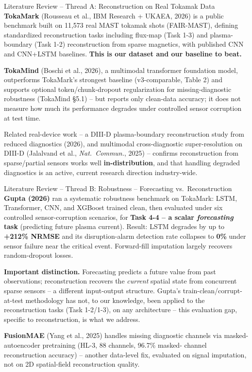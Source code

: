 \documentclass[aspectratio=169]{beamer}
\begin{document}
\begin{frame}{Literature Review -- Thread A: Reconstruction on Real Tokamak Data}
  \small
  \textbf{TokaMark} (Rousseau et al., IBM Research + UKAEA, 2026) is a
  public benchmark built on 11{,}573 real MAST tokamak shots (FAIR-MAST),
  defining standardized reconstruction tasks including flux-map (Task 1-3)
  and plasma-boundary (Task 1-2) reconstruction from sparse magnetics, with
  published CNN and CNN+LSTM baselines. \textbf{This is our dataset and our
  baseline to beat.}

  \vspace{4pt}
  \textbf{TokaMind} (Boschi et al., 2026), a multimodal transformer
  foundation model, outperforms TokaMark's strongest baseline (v3-comparable, Table 2) and supports optional token/chunk-dropout regularization for missing-diagnostic robustness (TokaMind \S5.1) --
  but reports only clean-data accuracy; it does not measure how much its
  performance degrades under controlled sensor corruption at test time.

  \vspace{4pt}
  Related real-device work -- a DIII-D plasma-boundary reconstruction study
  from reduced diagnostics (2026), and multimodal cross-diagnostic
  super-resolution on DIII-D (Jalalvand et al., \textit{Nat.\ Commun.},
  2025) -- confirms reconstruction from sparse/partial sensors works well
  \textbf{in-distribution}, and that handling degraded diagnostics is an
  active, current research direction industry-wide.
\end{frame}

\begin{frame}{Literature Review -- Thread B: Robustness -- Forecasting vs.\ Reconstruction}
  \small
  \textbf{Gupta (2026)} ran a systematic robustness benchmark on TokaMark:
  LSTM, Transformer, CNN, and XGBoost trained clean, then evaluated under
  six controlled sensor-corruption scenarios, for \textbf{Task 4-4 -- a
  scalar \emph{forecasting} task} (predicting future plasma current).
  Result: LSTM degrades by up to \textbf{+212\% NRMSE} and its
  disruption-alarm detection rate collapses to \textbf{0\%} under sensor
  failure near the critical event. Forward-fill imputation largely recovers
  random-dropout losses.

  \vspace{6pt}
  \textbf{Important distinction.} Forecasting predicts a future value from
  past observations; reconstruction recovers the \emph{current} spatial
  state from concurrent sparse sensors -- a different input-output
  structure. Gupta's train-clean/corrupt-at-test methodology has not, to
  our knowledge, been applied to the reconstruction tasks (Task 1-2/1-3),
  on any architecture -- this evaluation gap, specific to reconstruction, is
  what we address.

  \vspace{6pt}
  \textbf{FusionMAE} (Yang et al., 2025) handles missing diagnostic channels
  via masked-autoencoder pretraining (HL-3, 88 channels, 96.7\% masked-
  channel reconstruction accuracy) -- another data-level fix, evaluated on
  signal imputation, not on 2D spatial-field reconstruction quality.
\end{frame}
\end{document}
